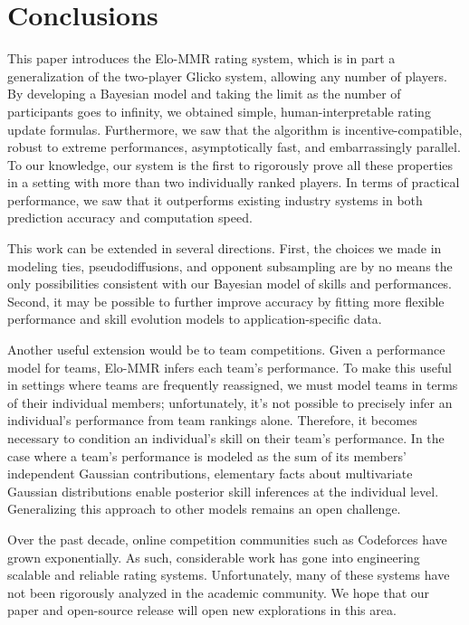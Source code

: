 
\section{Conclusions}
This paper introduces the Elo-MMR rating system, which is in part a generalization of the two-player Glicko system, allowing any number of players. By developing a Bayesian model and taking the limit as the number of participants goes to infinity, we obtained simple, human-interpretable rating update formulas. Furthermore, we saw that the algorithm is incentive-compatible, robust to extreme performances, asymptotically fast, and embarrassingly parallel. To our knowledge, our system is the first to rigorously prove all these properties in a setting with more than two individually ranked players. In terms of practical performance, we saw that it outperforms existing industry systems in both prediction accuracy and computation speed.

This work can be extended in several directions. First, the choices we made in modeling ties, pseudodiffusions, and opponent subsampling are by no means the only possibilities consistent with our Bayesian model of skills and performances. Second, it may be possible to further improve accuracy by fitting more flexible performance and skill evolution models to application-specific data.

Another useful extension would be to team competitions. Given a performance model for teams, Elo-MMR infers each team's performance. To make this useful in settings where teams are frequently reassigned, we must model teams in terms of their individual members; unfortunately, it's not possible to precisely infer an individual's performance from team rankings alone. Therefore, it becomes necessary to condition an individual's skill on their team's performance. In the case where a team's performance is modeled as the sum of its members' independent Gaussian contributions, elementary facts about multivariate Gaussian distributions enable posterior skill inferences at the individual level. Generalizing this approach to other models remains an open challenge.


Over the past decade, online competition communities such as Codeforces have grown exponentially. As such, considerable work has gone into engineering scalable and reliable rating systems. Unfortunately, many of these systems have not been rigorously analyzed in the academic community. We hope that our paper and open-source release will open new explorations in this area.

